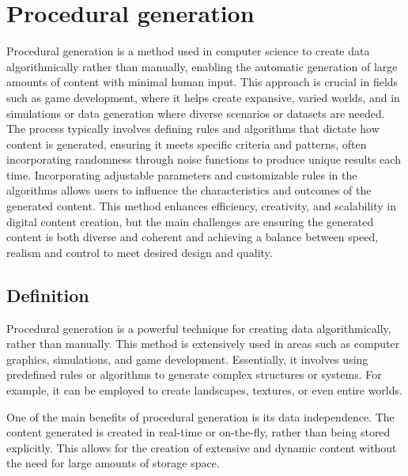 

\section{Procedural generation}
\label{sec:state-of-the-art_procedural-generation}
Procedural generation is a method used in computer science to create data algorithmically rather than manually, enabling the automatic generation of large amounts of content with minimal human input. This approach is crucial in fields such as game development, where it helps create expansive, varied worlds, and in simulations or data generation where diverse scenarios or datasets are needed. The process typically involves defining rules and algorithms that dictate how content is generated, ensuring it meets specific criteria and patterns, often incorporating randomness through noise functions to produce unique results each time. Incorporating adjustable parameters and customizable rules in the algorithms allows users to influence the characteristics and outcomes of the generated content. This method enhances efficiency, creativity, and scalability in digital content creation, but the main challenges are ensuring the generated content is both diverse and coherent and achieving a balance between speed, realism and control to meet desired design and quality.

\subsection{Definition}
Procedural generation is a powerful technique for creating data algorithmically, rather than manually. This method is extensively used in areas such as computer graphics, simulations, and game development. Essentially, it involves using predefined rules or algorithms to generate complex structures or systems. For example, it can be employed to create landscapes, textures, or even entire worlds.

One of the main benefits of procedural generation is its data independence. The content generated is created in real-time or on-the-fly, rather than being stored explicitly. This allows for the creation of extensive and dynamic content without the need for large amounts of storage space.

